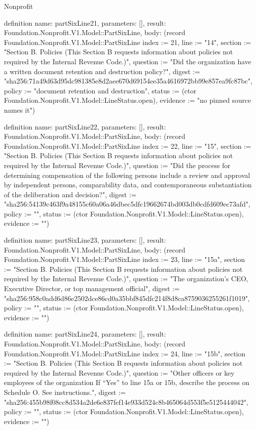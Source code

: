 \begin{lexlean}{Nonprofit}
\begin{semanticmodule}
definition{
  name: partSixLine21,
  parameters: [],
  result: Foundation.Nonprofit.V1.Model::PartSixLine,
  body: (record Foundation.Nonprofit.V1.Model::PartSixLine {index := 21, line := "14", section := "Section B. Policies (This Section B requests information about policies not required by the Internal Revenue Code.)", question := "Did the organization have a written document retention and destruction policy?", digest := "sha256:71a49d63d95dc981385e8d2aee670d69154ee35a4616972bb99e857ea9fc87bc", policy := "document retention and destruction", status := (ctor Foundation.Nonprofit.V1.Model::LineStatus.open), evidence := "no pinned source names it"})
}

definition{
  name: partSixLine22,
  parameters: [],
  result: Foundation.Nonprofit.V1.Model::PartSixLine,
  body: (record Foundation.Nonprofit.V1.Model::PartSixLine {index := 22, line := "15", section := "Section B. Policies (This Section B requests information about policies not required by the Internal Revenue Code.)", question := "Did the process for determining compensation of the following persons include a review and approval by independent persons, comparability data, and contemporaneous substantiation of the deliberation and decision?", digest := "sha256:54139c463f9a48155c60a06a46dbec5dfc19662674bd003db0cdfd609ec73afd", policy := "", status := (ctor Foundation.Nonprofit.V1.Model::LineStatus.open), evidence := ""})
}

definition{
  name: partSixLine23,
  parameters: [],
  result: Foundation.Nonprofit.V1.Model::PartSixLine,
  body: (record Foundation.Nonprofit.V1.Model::PartSixLine {index := 23, line := "15a", section := "Section B. Policies (This Section B requests information about policies not required by the Internal Revenue Code.)", question := "The organization’s CEO, Executive Director, or top management official", digest := "sha256:958c0add6d86e2502dce86cd0a35bbf845dfc214f8d8ca8759036255261f1019", policy := "", status := (ctor Foundation.Nonprofit.V1.Model::LineStatus.open), evidence := ""})
}

definition{
  name: partSixLine24,
  parameters: [],
  result: Foundation.Nonprofit.V1.Model::PartSixLine,
  body: (record Foundation.Nonprofit.V1.Model::PartSixLine {index := 24, line := "15b", section := "Section B. Policies (This Section B requests information about policies not required by the Internal Revenue Code.)", question := "Other officers or key employees of the organization If “Yes” to line 15a or 15b, describe the process on Schedule O. See instructions.", digest := "sha256:455b98f08cc8d534a2de6e837fef14e933d524c8b465064d553f5e5125444042", policy := "", status := (ctor Foundation.Nonprofit.V1.Model::LineStatus.open), evidence := ""})
}


\end{semanticmodule}
\end{lexlean}
